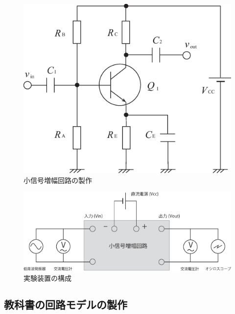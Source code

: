 \documentclass[uplatex,a4paper,11pt,oneside,openany]{jsbook}
\begin{document}
\begin{multicols}{2}
  \begin{figure}[H]
     \centering
      \includegraphics[keepaspectratio, scale=0.3, angle=0]
                  {figs/eps/exp1.eps}
                  \caption{小信号増幅回路の製作}
                  \label{fig:8_1}
  \end{figure}

  \begin{figure}[H]
     \centering
      \includegraphics[keepaspectratio, scale=0.3, angle=0]
                {figs/eps/sokutei.eps}
                \caption{実験装置の構成}
                \label{fig:8_2}
  \end{figure}
\end{multicols}


\subsection{教科書の回路モデルの製作}
\end{document}
